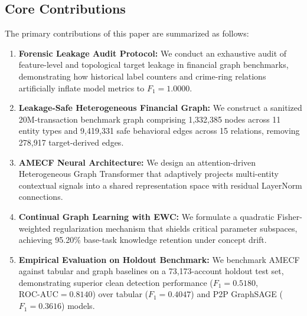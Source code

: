 \subsection{Core Contributions}
The primary contributions of this paper are summarized as follows:
\begin{enumerate}
    \item \textbf{Forensic Leakage Audit Protocol:} We conduct an exhaustive audit of feature-level and topological target leakage in financial graph benchmarks, demonstrating how historical label counters and crime-ring relations artificially inflate model metrics to $F_1 = 1.0000$.
    \item \textbf{Leakage-Safe Heterogeneous Financial Graph:} We construct a sanitized 20M-transaction benchmark graph comprising 1,332,385 nodes across 11 entity types and 9,419,331 safe behavioral edges across 15 relations, removing 278,917 target-derived edges.
    \item \textbf{AMECF Neural Architecture:} We design an attention-driven Heterogeneous Graph Transformer that adaptively projects multi-entity contextual signals into a shared representation space with residual LayerNorm connections.
    \item \textbf{Continual Graph Learning with EWC:} We formulate a quadratic Fisher-weighted regularization mechanism that shields critical parameter subspaces, achieving 95.20\% base-task knowledge retention under concept drift.
    \item \textbf{Empirical Evaluation on Holdout Benchmark:} We benchmark AMECF against tabular and graph baselines on a 73,173-account holdout test set, demonstrating superior clean detection performance ($F_1 = 0.5180$, $\text{ROC-AUC} = 0.8140$) over tabular ($F_1 = 0.4047$) and P2P GraphSAGE ($F_1 = 0.3616$) models.
\end{enumerate}
